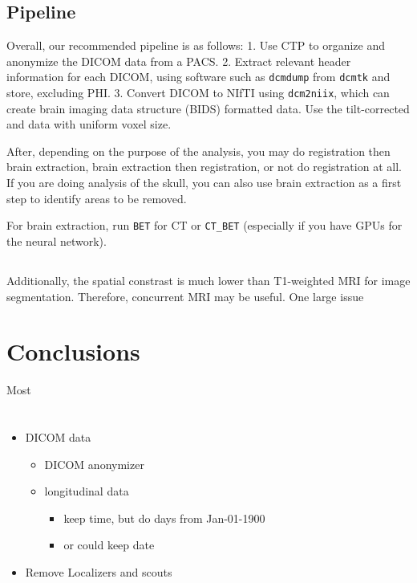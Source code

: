 \documentclass[]{elsarticle} %
\providecommand{\tightlist}{%
  \setlength{\itemsep}{0pt}\setlength{\parskip}{0pt}}
\begin{document}
\hypertarget{pipeline}{%
\subsection{Pipeline}\label{pipeline}}

Overall, our recommended pipeline is as follows: 1. Use CTP to organize
and anonymize the DICOM data from a PACS. 2. Extract relevant header
information for each DICOM, using software such as \texttt{dcmdump} from
\texttt{dcmtk} and store, excluding PHI. 3. Convert DICOM to NIfTI using
\texttt{dcm2niix}, which can create brain imaging data structure (BIDS)
formatted data. Use the tilt-corrected and data with uniform voxel size.

After, depending on the purpose of the analysis, you may do registration
then brain extraction, brain extraction then registration, or not do
registration at all. If you are doing analysis of the skull, you can
also use brain extraction as a first step to identify areas to be
removed.

For brain extraction, run \texttt{BET} for CT or \texttt{CT\_BET}
(especially if you have GPUs for the neural network).

\hypertarget{section}{%
\subsection{}\label{section}}

Additionally, the spatial constrast is much lower than T1-weighted MRI
for image segmentation. Therefore, concurrent MRI may be useful. One
large issue

\hypertarget{conclusions}{%
\section{Conclusions}\label{conclusions}}

Most

\hypertarget{section-1}{%
\section{}\label{section-1}}

\begin{itemize}
\tightlist
\item
  DICOM data

  \begin{itemize}
  \tightlist
  \item
    DICOM anonymizer
  \item
    longitudinal data

    \begin{itemize}
    \tightlist
    \item
      keep time, but do days from Jan-01-1900
    \item
      or could keep date
    \end{itemize}
  \end{itemize}
\item
  Remove Localizers and scouts
\end{itemize}
\end{document}
